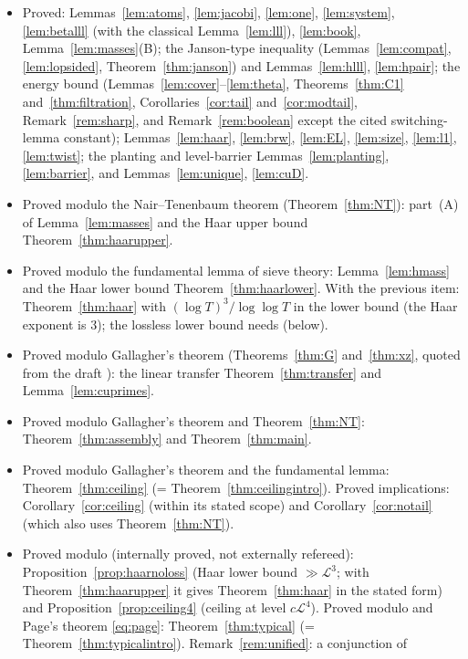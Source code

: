 \documentclass[11pt,reqno]{amsart}
\theoremstyle{definition}
\newcommand{\Lc}{\mathcal L}
\begin{document}
\begin{itemize}
\item Proved: Lemmas~\ref{lem:atoms}, \ref{lem:jacobi}, \ref{lem:one},
\ref{lem:system}, \ref{lem:betalll} (with the classical Lemma~\ref{lem:lll}),
\ref{lem:book}, Lemma~\ref{lem:masses}(B); the Janson-type inequality
(Lemmas~\ref{lem:compat}, \ref{lem:lopsided}, Theorem~\ref{thm:janson}) and
Lemmas~\ref{lem:hlll}, \ref{lem:hpair}; the energy bound
(Lemmas~\ref{lem:cover}--\ref{lem:theta}, Theorems~\ref{thm:C1}
and~\ref{thm:filtration}, Corollaries~\ref{cor:tail} and~\ref{cor:modtail},
Remark~\ref{rem:sharp}, and Remark~\ref{rem:boolean} except the cited
switching-lemma constant); Lemmas~\ref{lem:haar}, \ref{lem:brw}, \ref{lem:EL},
\ref{lem:size}, \ref{lem:l1}, \ref{lem:twist}; the planting and level-barrier
Lemmas~\ref{lem:planting}, \ref{lem:barrier}, and Lemmas~\ref{lem:unique},
\ref{lem:cuD}.
\item Proved modulo the Nair--Tenenbaum theorem (Theorem~\ref{thm:NT}):
part~(A) of Lemma~\ref{lem:masses} and the Haar upper bound
Theorem~\ref{thm:haarupper}.
\item Proved modulo the fundamental lemma of sieve theory: Lemma~\ref{lem:hmass}
and the Haar lower bound Theorem~\ref{thm:haarlower}.  With the previous
item: Theorem~\ref{thm:haar} with $(\log T)^3/\log\log T$ in the lower bound (the
Haar exponent is $3$); the lossless lower bound needs \cite{TQ} (below).
\item Proved modulo Gallagher's theorem (Theorems~\ref{thm:G}
and~\ref{thm:xz}, quoted from the draft \cite{MV3}): the linear transfer
Theorem~\ref{thm:transfer} and Lemma~\ref{lem:cuprimes}.
\item Proved modulo Gallagher's theorem and Theorem~\ref{thm:NT}:
Theorem~\ref{thm:assembly} and Theorem~\ref{thm:main}.
\item Proved modulo Gallagher's theorem and the fundamental lemma:
Theorem~\ref{thm:ceiling} (= Theorem~\ref{thm:ceilingintro}).  Proved
implications: Corollary~\ref{cor:ceiling} (within its stated scope) and
Corollary~\ref{cor:notail} (which also uses Theorem~\ref{thm:NT}).
\item Proved modulo \cite{TQ} (internally proved, not externally refereed):
Proposition~\ref{prop:haarnoloss} (Haar lower bound $\gg\Lc^3$; with
Theorem~\ref{thm:haarupper} it gives Theorem~\ref{thm:haar} in the stated
form) and Proposition~\ref{prop:ceiling4} (ceiling at level $c\Lc^4$).  Proved
modulo \cite{TQ} and Page's theorem \eqref{eq:page}: Theorem~\ref{thm:typical}
(= Theorem~\ref{thm:typicalintro}).  Remark~\ref{rem:unified}: a conjunction of

\end{itemize}
\end{document}
